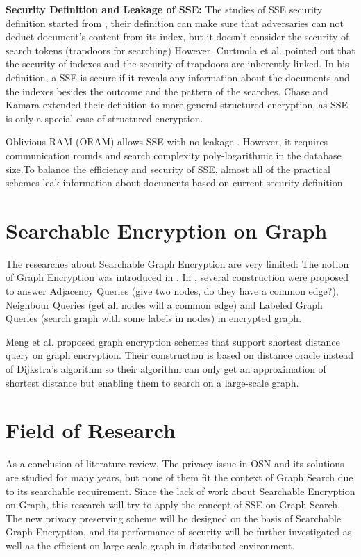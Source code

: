 {\bf Security Definition and Leakage of SSE:} The studies of SSE security definition started from \cite{goh2003secure}, their definition can make sure that adversaries can not deduct document's content from its index, but it doesn't consider the security of search tokens (trapdoors for searching) However, Curtmola et al. \cite{curtmola2011searchable} pointed out that the security of indexes and the security of trapdoors are inherently linked. In his definition, a SSE is secure if it reveals any information about the documents and the indexes besides the outcome and the pattern of the searches. Chase and Kamara \cite{chase2010structured} extended their definition to more general structured encryption, as SSE is only a special case of structured encryption.

Oblivious RAM (ORAM) allows SSE with no leakage \cite{goldreich1996software}. However, it requires communication rounds and search complexity poly-logarithmic in the database size.To balance the efficiency and security of SSE, almost all of the practical schemes leak information about documents based on current security definition.

\section{Searchable Encryption on Graph}
The researches about Searchable Graph Encryption are very limited: The notion of Graph Encryption was introduced in \cite{chase2010structured}. In \cite{chase2010structured}, several construction were proposed to answer Adjacency Queries (give two nodes, do they have a common edge?), Neighbour Queries (get all nodes will a common edge) and Labeled Graph Queries (search graph with some labels in nodes) in encrypted graph.

Meng et al. \cite{meng2015grecs} proposed graph encryption schemes that support shortest distance query on graph encryption. Their construction is based on distance oracle instead of Dijkstra's algorithm so their algorithm can only get an approximation of shortest distance but enabling them to search on a large-scale graph.

\section{Field of Research}
As a conclusion of literature review, The privacy issue in OSN and its solutions are studied for many years, but none of them fit the context of Graph Search due to its searchable requirement. Since the lack of work about Searchable Encryption on Graph, this research will try to apply the concept of SSE on Graph Search. The new privacy preserving scheme will be designed on the basis of Searchable Graph Encryption, and its performance of security will be further investigated as well as the efficient on large scale graph in distributed environment.
















